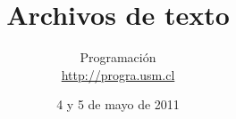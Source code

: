 \documentclass[12pt]{beamer}
\title{Archivos de texto}
\author{
  Programación \\ \url{http://progra.usm.cl}
}
\date{4 y 5 de mayo de 2011}
\begin{document}
  \begin{frame}
    \maketitle
  \end{frame}

  \begin{frame}
  \end{frame}
\end{document}
